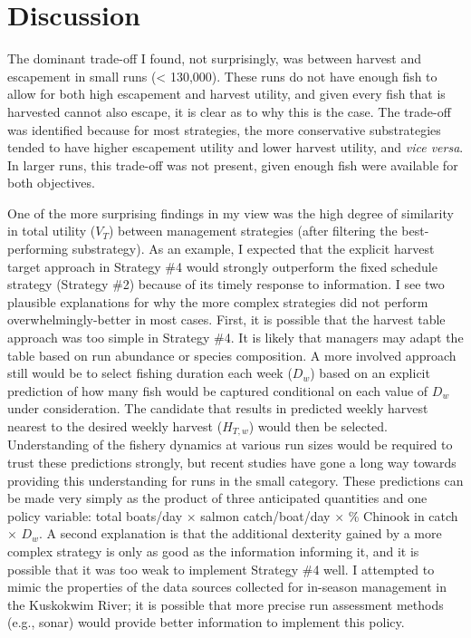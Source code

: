 \documentclass[12pt,]{book}
\theoremstyle{definition}
\theoremstyle{definition}
\theoremstyle{definition}
\theoremstyle{remark}
\begin{document}
\section{Discussion}\label{discussion-1}

\noindent
The dominant trade-off I found, not surprisingly, was between harvest
and escapement in small runs (\textless{} 130,000). These runs do not
have enough fish to allow for both high escapement and harvest utility,
and given every fish that is harvested cannot also escape, it is clear
as to why this is the case. The trade-off was identified because for
most strategies, the more conservative substrategies tended to have
higher escapement utility and lower harvest utility, and \emph{vice
versa}. In larger runs, this trade-off was not present, given enough
fish were available for both objectives.

One of the more surprising findings in my view was the high degree of
similarity in total utility (\(V_T\)) between management strategies
(after filtering the best-performing substrategy). As an example, I
expected that the explicit harvest target approach in Strategy \#4 would
strongly outperform the fixed schedule strategy (Strategy \#2) because
of its timely response to information. I see two plausible explanations
for why the more complex strategies did not perform
overwhelmingly-better in most cases. First, it is possible that the
harvest table approach was too simple in Strategy \#4. It is likely that
managers may adapt the table based on run abundance or species
composition. A more involved approach still would be to select fishing
duration each week (\(D_w\)) based on an explicit prediction of how many
fish would be captured conditional on each value of \(D_w\) under
consideration. The candidate that results in predicted weekly harvest
nearest to the desired weekly harvest (\(H_{T,w}\)) would then be
selected. Understanding of the fishery dynamics at various run sizes
would be required to trust these predictions strongly, but recent
studies \citep{staton-coggins-2016, staton-coggins-2017, staton-2018}
have gone a long way towards providing this understanding for runs in
the small category. These predictions can be made very simply as the
product of three anticipated quantities and one policy variable: total
boats/day \(\times\) salmon catch/boat/day \(\times\) \% Chinook in
catch \(\times\) \(D_w\). A second explanation is that the additional
dexterity gained by a more complex strategy is only as good as the
information informing it, and it is possible that it was too weak to
implement Strategy \#4 well. I attempted to mimic the properties of the
data sources collected for in-season management in the Kuskokwim River;
it is possible that more precise run assessment methods (e.g., sonar)
would provide better information to implement this policy.
\end{document}
